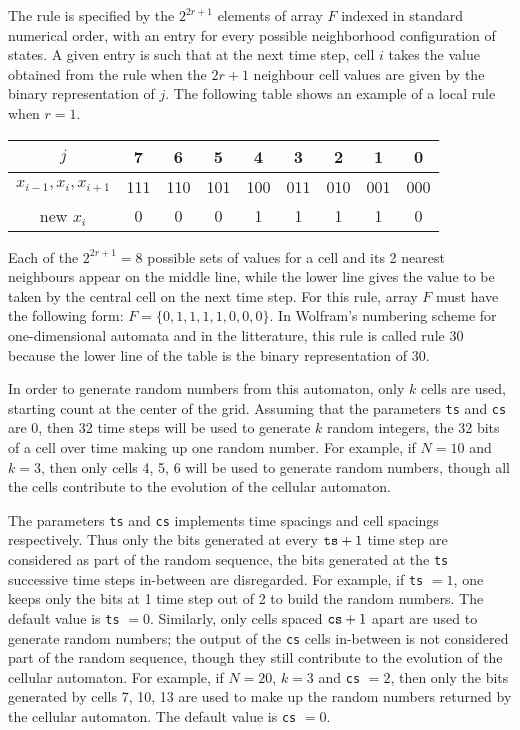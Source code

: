 The rule is specified by the $2^{2r + 1}$ elements
 of array $F$ indexed in standard numerical order, with an entry for
  every possible neighborhood configuration of states. A given entry is
 such that at the next time step, cell
 $i$ takes the value obtained from the rule when the $2r+1$ neighbour cell
 values are given by the binary representation of $j$. The following
 table  shows an example of a local rule when $r=1$.

\begin{center}
\begin{tabular}{|c|c|c|c|c|c|c|c|c|}\hline
   $j$                   & 7 & 6 & 5 & 4 & 3 & 2 & 1 & 0 \\ \hline
 $x_{i-1}, x_i, x_{i+1}$
       & 111 & 110 & 101 & 100 & 011  & 010 & 001 & 000 \\ \hline
    new $x_i$ & 0 & 0 & 0 & 1 & 1 & 1 & 1 & 0 \\ \hline
\end{tabular}
\end{center}

 Each of the $2^{2r + 1} = 8$ possible sets of values for a cell and its
 2 nearest neighbours appear on the middle line, while the lower line
 gives the  value to be taken
 by the central cell on the next time step. For this rule, array $F$
 must have the following form: $F = \{ 0, 1, 1, 1, 1, 0, 0, 0 \}$.
 In Wolfram's numbering scheme for one-dimensional automata \cite{rWOL86a}
 and in the litterature, this rule is called rule 30 because the
 lower line of the table is the binary representation of 30.

 In order to generate random numbers from this automaton, only $k$ cells
 are used, starting count at the center of the grid. Assuming that
 the parameters
 {\tt ts}  and {\tt cs} are 0, then 32 time steps will be used
 to generate $k$  random integers, the 32 bits of a cell over time
 making up one random number. For example, if $N=10$ and $k=3$, then only
 cells 4, 5, 6 will be used to generate random numbers, though
 all the cells contribute to the evolution of the  cellular automaton.

 The parameters {\tt ts}  and {\tt cs} implements time spacings and cell
  spacings respectively. Thus only the bits generated at every ${\tt ts} + 1$
 time step are considered as part of the random sequence, the bits generated
 at the {\tt ts} successive time steps in-between are disregarded.
 For example, if  {\tt ts} $=1$, one keeps only the bits at 1 time step out
 of 2 to build the random numbers. The default value is {\tt ts} $=0$.
 Similarly, only cells spaced ${\tt cs} + 1$ apart are used to generate random
 numbers; the output of the {\tt cs} cells
 in-between is not considered part of the random sequence, though they still
 contribute to the evolution of the  cellular automaton.
 For example, if $N=20$, $k=3$ and  {\tt cs} $=2$, then only the bits
 generated by cells 7, 10, 13 are used to make up the random numbers
 returned by the cellular automaton. The default value is {\tt cs} $=0$.

